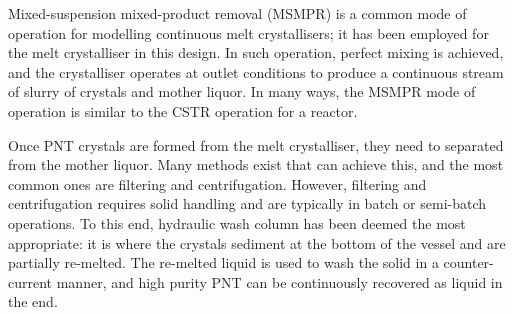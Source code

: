 Mixed-suspension mixed-product removal (MSMPR) is a common mode of operation for modelling continuous melt crystallisers; it has been employed for the melt crystalliser in this design. In such operation, perfect mixing is achieved, and the crystalliser operates at outlet conditions to produce a continuous stream of slurry of crystals and mother liquor. In many ways, the MSMPR mode of operation is similar to the CSTR operation for a reactor. 


Once PNT crystals are formed from the melt crystalliser, they need to separated from the mother liquor. Many methods exist that can achieve this, and the most common ones are filtering and centrifugation. However, filtering and centrifugation requires solid handling and are typically in batch or semi-batch operations. To this end, hydraulic wash column has been deemed the most appropriate: it is where the crystals sediment at the bottom of the vessel and are partially re-melted. The re-melted liquid is used to wash the solid in a counter-current manner, and high purity PNT can be continuously recovered as liquid in the end. 